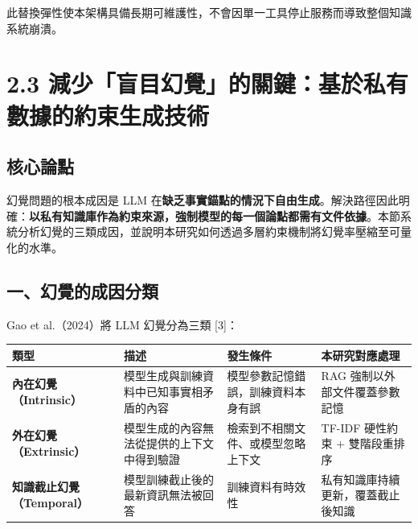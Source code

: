 此替換彈性使本架構具備長期可維護性，不會因單一工具停止服務而導致整個知識系統崩潰。

\chapter{2.3
減少「盲目幻覺」的關鍵：基於私有數據的約束生成技術}\label{ux6e1bux5c11ux76f2ux76eeux5e7bux89baux7684ux95dcux9375ux57faux65bcux79c1ux6709ux6578ux64daux7684ux7d04ux675fux751fux6210ux6280ux8853}

\section{核心論點}\label{ux6838ux5fc3ux8ad6ux9ede-1}

幻覺問題的根本成因是 LLM
在\textbf{缺乏事實錨點的情況下自由生成}。解決路徑因此明確：\textbf{以私有知識庫作為約束來源，強制模型的每一個論點都需有文件依據}。本節系統分析幻覺的三類成因，並說明本研究如何透過多層約束機制將幻覺率壓縮至可量化的水準。

\section{一、幻覺的成因分類}\label{ux4e00ux5e7bux89baux7684ux6210ux56e0ux5206ux985e}

Gao et al.（2024）將 LLM 幻覺分為三類 {[}3{]}：

{\def\LTcaptype{none} %
\begin{longtable}[]{@{}
  >{\raggedright\arraybackslash}p{}
  >{\raggedright\arraybackslash}p{}
  >{\raggedright\arraybackslash}p{}
  >{\raggedright\arraybackslash}p{}@{}}
\toprule\noalign{}
\begin{minipage}[b]{\linewidth}\raggedright
類型
\end{minipage} & \begin{minipage}[b]{\linewidth}\raggedright
描述
\end{minipage} & \begin{minipage}[b]{\linewidth}\raggedright
發生條件
\end{minipage} & \begin{minipage}[b]{\linewidth}\raggedright
本研究對應處理
\end{minipage} \\
\midrule\noalign{}
\endhead
\bottomrule\noalign{}
\endlastfoot
\textbf{內在幻覺（Intrinsic）} &
模型生成與訓練資料中已知事實相矛盾的內容 &
模型參數記憶錯誤，訓練資料本身有誤 & RAG 強制以外部文件覆蓋參數記憶 \\
\textbf{外在幻覺（Extrinsic）} &
模型生成的內容無法從提供的上下文中得到驗證 &
檢索到不相關文件、或模型忽略上下文 & TF-IDF 硬性約束 + 雙階段重排序 \\
\textbf{知識截止幻覺（Temporal）} & 模型訓練截止後的最新資訊無法被回答 &
訓練資料有時效性 & 私有知識庫持續更新，覆蓋截止後知識 \\
\end{longtable}
}

